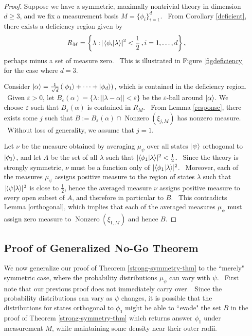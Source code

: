 \documentclass[letterpaper,11pt]{article}
\newcommand{\braket}[2]{\mbox{$ \langle #1 | #2 \rangle $}}
\newcommand{\ket}[1]{\mbox{$ | #1 \rangle $}}
\DeclareMathOperator{\nz}{Nonzero}
\begin{document}
\begin{proof}
Suppose we have a symmetric, maximally nontrivial theory in dimension $d\geq 3$, and we fix a measurement basis $M=\{\phi_i\}_{i=1}^d$. \ From Corollary \ref{deficient}, there exists a deficiency region given by
\[ R_M = \left\{\lambda:|\braket{\phi_i}{\lambda}|^2 <\frac{1}{2}\,, i=1,\ldots,d\right\}, \]
\noindent perhaps minus a set of measure zero. \ This is illustrated in Figure \ref{figdeficiency} for the case where $d=3$.

Consider $\ket{\alpha}=\frac{1}{\sqrt{d}}\left(\ket{\phi_1}+\cdots +\ket{\phi_d}\right)$, which is contained in the deficiency region. \
Given $\varepsilon >0$, let $B_\varepsilon (\alpha)=\{\lambda:||\lambda-\alpha||<\varepsilon\}$ be the $\varepsilon$-ball around $\ket{\alpha}$. We choose $\varepsilon$ such that $B_\varepsilon (\alpha)$ is contained in $R_M$. \ From Lemma \ref{response}, there exists some $j$ such that $B := B_\varepsilon(\alpha)\cap\nz(\xi_{j,M})$ has nonzero measure. \  Without loss of generality, we assume that $j=1$.

Let $\nu$ be the measure obtained by averaging $\mu_{\psi}$ over all states $\ket{\psi}$ orthogonal to $\ket{\phi_1}$, and let $A$ be the set of all $\lambda$ such that $|\braket{\phi_1}{\lambda}|^2<\frac{1}{2}$. \ Since the theory is strongly symmetric, $\nu$ must be a function only of $|\braket{\phi_1}{\lambda}|^2$. \ Moreover, each of the measures $\mu_{\psi}$ assigns positive measure to the region of states $\lambda$ such that $|\braket{\psi}{\lambda}|^2$ is close to $\frac{1}{2}$, hence the averaged measure $\nu$ assigns positive measure to every open subset of $A$, and therefore in particular to $B$. \ This contradicts Lemma \ref{orthogonal}, which implies that each of the averaged measures $\mu_{\psi}$ must assign zero measure to $\nz(\xi_{1,M})$ and hence $B$.
\end{proof}



\subsection{Proof of Generalized No-Go Theorem}

We now generalize our proof of Theorem \ref{strong-symmetry-thm} to the ``merely" symmetric case, where the probability distributions $\mu_\psi$ can vary with $\psi$. \ First note that our previous proof does not immediately carry over. \ Since the probability distributions can vary as $\psi$ changes, it is possible that the distributions for states orthogonal to $\phi_1$ might be able to ``evade" the set $B$ in the proof of Theorem \ref{strong-symmetry-thm} which returns answer $\phi_1$ under measurement $M$, while maintaining some density near their outer radii.
\end{document}
